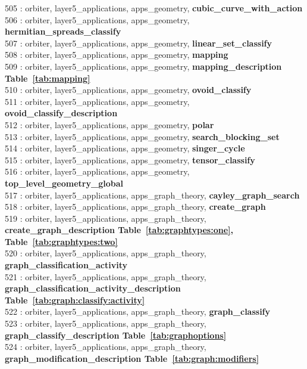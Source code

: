 505 : orbiter, layer5\_applications, apps\_geometry, {\bf cubic\_curve\_with\_action}\\
506 : orbiter, layer5\_applications, apps\_geometry, {\bf hermitian\_spreads\_classify}\\
507 : orbiter, layer5\_applications, apps\_geometry, {\bf linear\_set\_classify}\\
508 : orbiter, layer5\_applications, apps\_geometry, {\bf mapping}\\
509 : orbiter, layer5\_applications, apps\_geometry, {\bf mapping\_description Table~\ref{tab:mapping}}\\
510 : orbiter, layer5\_applications, apps\_geometry, {\bf ovoid\_classify}\\
511 : orbiter, layer5\_applications, apps\_geometry, {\bf ovoid\_classify\_description}\\
512 : orbiter, layer5\_applications, apps\_geometry, {\bf polar}\\
513 : orbiter, layer5\_applications, apps\_geometry, {\bf search\_blocking\_set}\\
514 : orbiter, layer5\_applications, apps\_geometry, {\bf singer\_cycle}\\
515 : orbiter, layer5\_applications, apps\_geometry, {\bf tensor\_classify}\\
516 : orbiter, layer5\_applications, apps\_geometry, {\bf top\_level\_geometry\_global}\\
517 : orbiter, layer5\_applications, apps\_graph\_theory, {\bf cayley\_graph\_search}\\
518 : orbiter, layer5\_applications, apps\_graph\_theory, {\bf create\_graph}\\
519 : orbiter, layer5\_applications, apps\_graph\_theory, {\bf create\_graph\_description Table~\ref{tab:graphtypes:one},  Table~\ref{tab:graphtypes:two}}\\
520 : orbiter, layer5\_applications, apps\_graph\_theory, {\bf graph\_classification\_activity}\\
521 : orbiter, layer5\_applications, apps\_graph\_theory, {\bf graph\_classification\_activity\_description Table~\ref{tab:graph:classify:activity}}\\
522 : orbiter, layer5\_applications, apps\_graph\_theory, {\bf graph\_classify}\\
523 : orbiter, layer5\_applications, apps\_graph\_theory, {\bf graph\_classify\_description Table~\ref{tab:graphoptions}}\\
524 : orbiter, layer5\_applications, apps\_graph\_theory, {\bf graph\_modification\_description Table~\ref{tab:graph:modifiers}}\\
